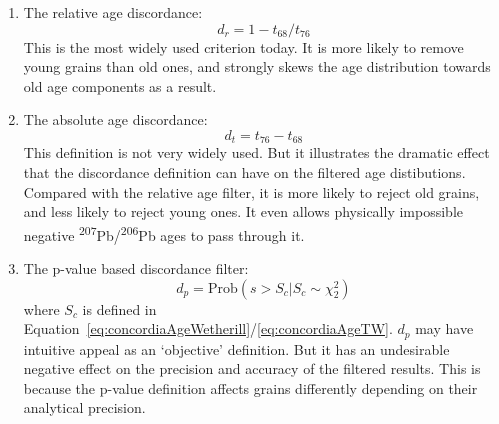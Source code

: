 \begin{refsection}
\begin{enumerate}
  \item The relative age discordance:
    \begin{equation}
      d_{r} = 1 - t_{68}/t_{76}
      \label{eq:dr}
    \end{equation}
    This is the most widely used criterion today.  It is more likely
    to remove young grains than old ones, and strongly skews the age
    distribution towards old age components as a result.
  \item The absolute age discordance:
    \begin{equation}
      d_{t} = t_{76} - t_{68}
      \label{eq:dt}
    \end{equation}
    This definition is not very widely used. But it illustrates the
    dramatic effect that the discordance definition can have on the
    filtered age distibutions. Compared with the relative age filter,
    it is more likely to reject old grains, and less likely to reject
    young ones. It even allows physically impossible negative
    \textsuperscript{207}Pb/\textsuperscript{206}Pb ages to pass
    through it.
  \item The p-value based discordance filter:
    \begin{equation}
      d_p = \mbox{Prob}\left(s > S_c | S_c \sim \chi^2_2\right)
      \label{eq:dp}
    \end{equation}
    \noindent where $S_c$ is defined in
    Equation~\ref{eq:concordiaAgeWetherill}/\ref{eq:concordiaAgeTW}.
    $d_p$ may have intuitive appeal as an `objective' definition. But
    it has an undesirable negative effect on the precision and
    accuracy of the filtered results.  This is because the p-value
    definition affects grains differently depending on their
    analytical precision.


\end{enumerate}
\end{refsection}
